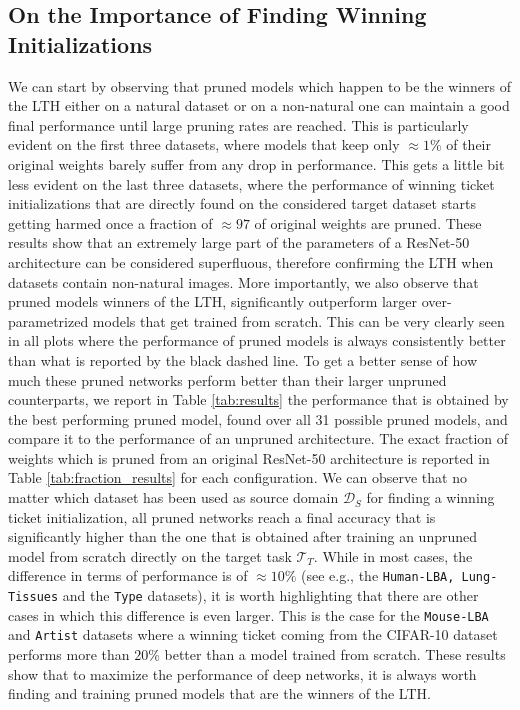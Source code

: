 \subsection{On the Importance of Finding Winning Initializations}
We can start by observing that pruned models which happen to be the winners of the LTH either on a natural dataset or on a non-natural one can maintain a good final performance until large pruning rates are reached. This is particularly evident on the first three datasets, where models that keep only $\approx 1\%$ of their original weights barely suffer from any drop in performance. This gets a little bit less evident on the last three datasets, where the performance of winning ticket initializations that are directly found on the considered target dataset starts getting harmed once a fraction of $\approx 97$ of original weights are pruned. These results show that an extremely large part of the parameters of a ResNet-50 architecture can be considered superfluous, therefore confirming the LTH when datasets contain non-natural images. More importantly, we also observe that pruned models winners of the LTH, significantly outperform larger over-parametrized models that get trained from scratch. This can be very clearly seen in all plots where the performance of pruned models is always consistently better than what is reported by the black dashed line. To get a better sense of how much these pruned networks perform better than their larger unpruned counterparts, we report in Table \ref{tab:results} the performance that is obtained by the best performing pruned model, found over all 31 possible pruned models, and compare it to the performance of an unpruned architecture. The exact fraction of weights which is pruned from an original ResNet-50 architecture is reported in Table \ref{tab:fraction_results} for each configuration. We can observe that no matter which dataset has been used as source domain $\mathcal{D}_S$ for finding a winning ticket initialization, all pruned networks reach a final accuracy that is significantly higher than the one that is obtained after training an unpruned model from scratch directly on the target task $\mathcal{T}_T$. While in most cases, the difference in terms of performance is of $\approx 10\%$ (see e.g., the \texttt{Human-LBA, Lung-Tissues} and the \texttt{Type} datasets), it is worth highlighting that there are other cases in which this difference is even larger. This is the case for the \texttt{Mouse-LBA} and \texttt{Artist}  datasets where a winning ticket coming from the CIFAR-10 dataset performs more than $20\%$ better than a model trained from scratch. These results show that to maximize the performance of deep networks, it is always worth finding and training pruned models that are the winners of the LTH.

